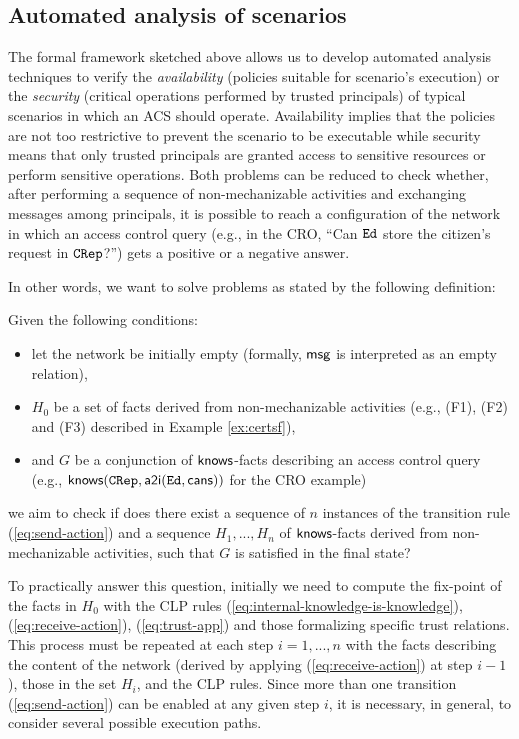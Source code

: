 \documentclass[conference]{llncs}
\newcommand{\Ed}{\ensuremath \mathtt{Ed}}
\newcommand{\CRep}{\ensuremath \mathtt{CRep}}
\newcommand{\canstoredoc}{\ensuremath \mathsf{cans}}
\newcommand{\know}{\ensuremath \mathsf{knows}}
\newcommand{\msg}{\ensuremath \mathsf{msg}}
\newcommand{\atoi}{\ensuremath \mathsf{a2i}}
\newcommand{\CRO}{CRO}
\begin{document}
\subsection{Automated analysis of scenarios}
The formal framework sketched above allows us to develop automated analysis techniques to verify the \emph{availability} (policies suitable for scenario's execution) or the \emph{security}  (critical operations performed by trusted principals) of typical
scenarios in which an ACS should operate.  
Availability implies that
the policies are not too restrictive to prevent the scenario to be
executable while security means that only trusted principals are
granted access to sensitive resources or perform sensitive operations.
Both problems can be reduced to check whether, after performing a
sequence of non-mechanizable activities and exchanging messages among
principals, it is possible to reach a configuration of the network in
which an access control query (e.g., in the \CRO{}, ``Can $\Ed$ store
the citizen's request in $\CRep$?'') gets a positive or a negative
answer.


In other words, we want to solve problems as stated by the following definition: 
\begin{definition} 
\label{def:reachprobs}
Given the following conditions:
\begin{itemize}
\item let the network be initially empty (formally, $\msg$ is
interpreted as an empty relation),
\item  $H_0$ be a set of facts derived
from non-mechanizable activities (e.g., (F1), (F2) and (F3) described in Example \ref{ex:certsf}),	
\item and $G$ be a conjunction of $\know$-facts
describing an access control query (e.g., $\know(\CRep,
\atoi(\Ed,\canstoredoc))$ for the \CRO{} example)
\end{itemize}
we aim to check if
does there exist a sequence of $n$ instances of the transition rule
(\ref{eq:send-action}) and a sequence $H_1, ..., H_n$ of $\know$-facts
derived from non-mechanizable activities, such that $G$ is satisfied in
the final state?
\end{definition}
To practically answer this question, initially we need to compute the fix-point of the facts in $H_0$ with the CLP rules (\ref{eq:internal-knowledge-is-knowledge}),
(\ref{eq:receive-action}), (\ref{eq:trust-app}) and those formalizing
specific trust relations.  This process must be repeated at each step
$i=1, ..., n$ with the facts describing the content of the network
(derived by applying (\ref{eq:receive-action}) at step $i-1$), those
in the set $H_i$, and the CLP rules.  Since more than one transition
(\ref{eq:send-action}) can be enabled at any given step $i$, it is
necessary, in general, to consider several possible execution paths.
\end{document}
